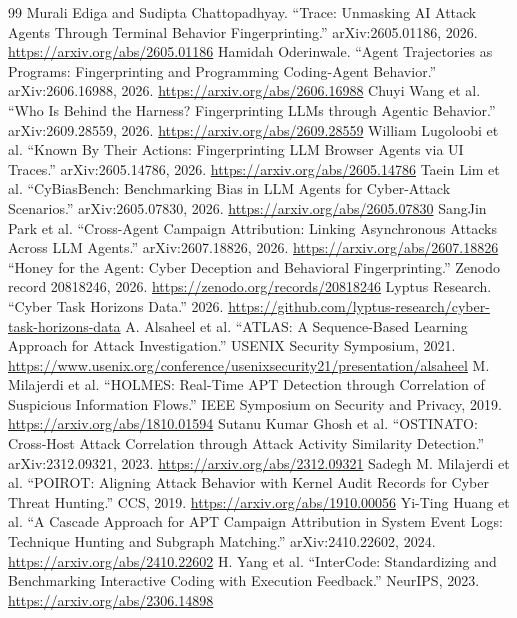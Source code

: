 \documentclass[10pt]{article}
\begin{document}
\begin{thebibliography}{99}
 Murali Ediga and Sudipta Chattopadhyay. ``Trace: Unmasking AI Attack Agents Through Terminal Behavior Fingerprinting.'' arXiv:2605.01186, 2026. \url{https://arxiv.org/abs/2605.01186}
 Hamidah Oderinwale. ``Agent Trajectories as Programs: Fingerprinting and Programming Coding-Agent Behavior.'' arXiv:2606.16988, 2026. \url{https://arxiv.org/abs/2606.16988}
 Chuyi Wang et al. ``Who Is Behind the Harness? Fingerprinting LLMs through Agentic Behavior.'' arXiv:2609.28559, 2026. \url{https://arxiv.org/abs/2609.28559}
 William Lugoloobi et al. ``Known By Their Actions: Fingerprinting LLM Browser Agents via UI Traces.'' arXiv:2605.14786, 2026. \url{https://arxiv.org/abs/2605.14786}
 Taein Lim et al. ``CyBiasBench: Benchmarking Bias in LLM Agents for Cyber-Attack Scenarios.'' arXiv:2605.07830, 2026. \url{https://arxiv.org/abs/2605.07830}
 SangJin Park et al. ``Cross-Agent Campaign Attribution: Linking Asynchronous Attacks Across LLM Agents.'' arXiv:2607.18826, 2026. \url{https://arxiv.org/abs/2607.18826}
 ``Honey for the Agent: Cyber Deception and Behavioral Fingerprinting.'' Zenodo record 20818246, 2026. \url{https://zenodo.org/records/20818246}
 Lyptus Research. ``Cyber Task Horizons Data.'' 2026. \url{https://github.com/lyptus-research/cyber-task-horizons-data}
 A. Alsaheel et al. ``ATLAS: A Sequence-Based Learning Approach for Attack Investigation.'' USENIX Security Symposium, 2021. \url{https://www.usenix.org/conference/usenixsecurity21/presentation/alsaheel}
 M. Milajerdi et al. ``HOLMES: Real-Time APT Detection through Correlation of Suspicious Information Flows.'' IEEE Symposium on Security and Privacy, 2019. \url{https://arxiv.org/abs/1810.01594}
 Sutanu Kumar Ghosh et al. ``OSTINATO: Cross-Host Attack Correlation through Attack Activity Similarity Detection.'' arXiv:2312.09321, 2023. \url{https://arxiv.org/abs/2312.09321}
 Sadegh M. Milajerdi et al. ``POIROT: Aligning Attack Behavior with Kernel Audit Records for Cyber Threat Hunting.'' CCS, 2019. \url{https://arxiv.org/abs/1910.00056}
 Yi-Ting Huang et al. ``A Cascade Approach for APT Campaign Attribution in System Event Logs: Technique Hunting and Subgraph Matching.'' arXiv:2410.22602, 2024. \url{https://arxiv.org/abs/2410.22602}
 H. Yang et al. ``InterCode: Standardizing and Benchmarking Interactive Coding with Execution Feedback.'' NeurIPS, 2023. \url{https://arxiv.org/abs/2306.14898}
\end{thebibliography}
\end{document}
